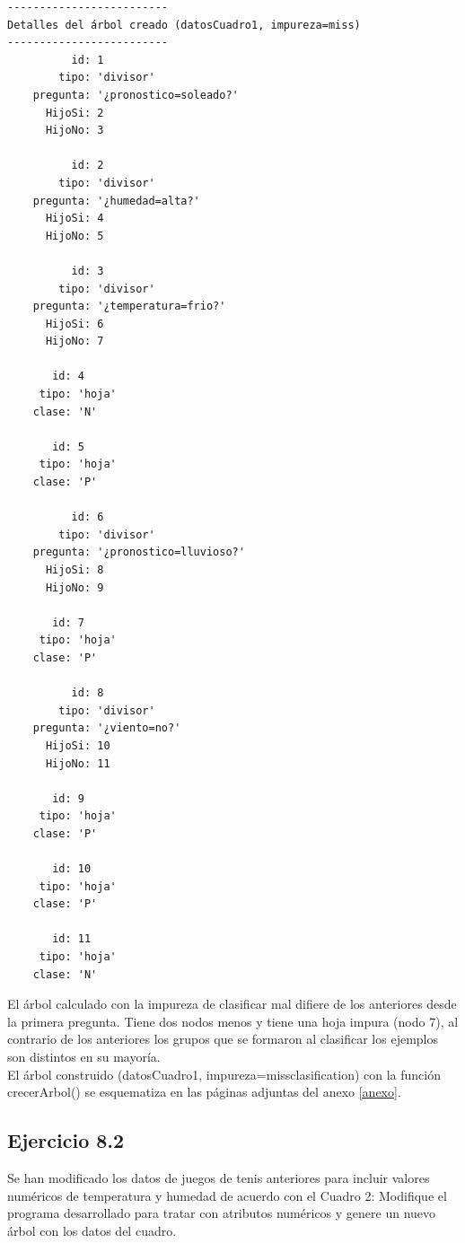 \documentclass[11pt,a4paper,final]{article}
\begin{document}
\begin{verbatim}-------------------------
Detalles del árbol creado (datosCuadro1, impureza=miss)
-------------------------
          id: 1
        tipo: 'divisor'
    pregunta: '¿pronostico=soleado?'
      HijoSi: 2
      HijoNo: 3

          id: 2
        tipo: 'divisor'
    pregunta: '¿humedad=alta?'
      HijoSi: 4
      HijoNo: 5

          id: 3
        tipo: 'divisor'
    pregunta: '¿temperatura=frio?'
      HijoSi: 6
      HijoNo: 7

       id: 4
     tipo: 'hoja'
    clase: 'N'

       id: 5
     tipo: 'hoja'
    clase: 'P'

          id: 6
        tipo: 'divisor'
    pregunta: '¿pronostico=lluvioso?'
      HijoSi: 8
      HijoNo: 9

       id: 7
     tipo: 'hoja'
    clase: 'P'

          id: 8
        tipo: 'divisor'
    pregunta: '¿viento=no?'
      HijoSi: 10
      HijoNo: 11

       id: 9
     tipo: 'hoja'
    clase: 'P'

       id: 10
     tipo: 'hoja'
    clase: 'P'

       id: 11
     tipo: 'hoja'
    clase: 'N'
\end{verbatim}
    
El árbol calculado con la impureza de clasificar mal difiere de los anteriores desde la primera pregunta. Tiene dos nodos menos y tiene una hoja impura (nodo 7), al contrario de los anteriores los grupos que se formaron al clasificar los ejemplos son distintos en su mayoría.\\

El árbol construido (datosCuadro1, impureza=missclasification) con la función crecerArbol() se esquematiza en las páginas adjuntas del anexo \ref{anexo}.



\subsection*{Ejercicio 8.2}


Se han modificado los datos de juegos de tenis anteriores para incluir valores numéricos de temperatura y humedad de acuerdo con el Cuadro 2: Modifique el programa desarrollado para tratar con atributos numéricos y genere un nuevo árbol con los datos del cuadro.
\end{document}

